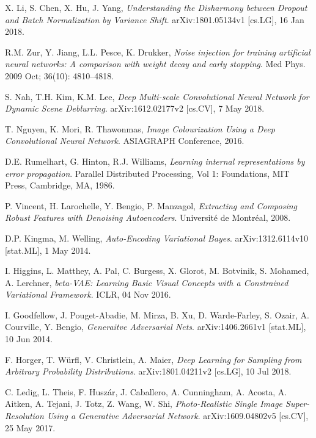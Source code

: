 \documentclass[../main.tex]{subfiles}
\begin{document}
\begin{thebibliography}{999}
X. Li, S. Chen, X. Hu, J. Yang,
\emph{Understanding the Disharmony between Dropout and Batch Normalization by Variance Shift}.
arXiv:1801.05134v1 [cs.LG],
16 Jan 2018.

  R.M. Zur, Y. Jiang, L.L. Pesce, K. Drukker,
  \emph{Noise injection for training artificial neural networks: A comparison with weight decay and early stopping}.
  Med Phys.
  2009 Oct;
  36(10): 4810–4818.

  S. Nah, T.H. Kim, K.M. Lee,
  \emph{Deep Multi-scale Convolutional Neural Network for Dynamic Scene Deblurring}.
  arXiv:1612.02177v2 [cs.CV],
  7 May 2018.

  T. Nguyen, K. Mori, R. Thawonmas,
  \emph{Image Colourization Using a Deep Convolutional Neural Network}.
  ASIAGRAPH Conference,
  2016.

  D.E. Rumelhart, G. Hinton, R.J. Williams,
  \emph{Learning internal representations by error propagation}.
  Parallel Distributed Processing,
  Vol 1: Foundations,
  MIT Press,
  Cambridge, MA,
  1986.

  P. Vincent, H. Larochelle, Y. Bengio, P. Manzagol,
  \emph{Extracting and Composing Robust Features with Denoising Autoencoders}.
  Universit\'e de Montr\'eal,
  2008.

  D.P. Kingma, M. Welling,
  \emph{Auto-Encoding Variational Bayes}.
  arXiv:1312.6114v10 [stat.ML],
  1 May 2014.

  I. Higgins, L. Matthey, A. Pal, C. Burgess, X. Glorot, M. Botvinik, S. Mohamed, A. Lerchner,
  \emph{beta-VAE: Learning Basic Visual Concepts with a Constrained Variational Framework}.
  ICLR,
  04 Nov 2016.

  I. Goodfellow, J. Pouget-Abadie, M. Mirza, B. Xu, D. Warde-Farley, S. Ozair, A. Courville, Y. Bengio,
  \emph{Generaitve Adversarial Nets}.
  arXiv:1406.2661v1 [stat.ML],
  10 Jun 2014.

  F. Horger, T. W\"urfl, V. Christlein, A. Maier,
  \emph{Deep Learning for Sampling from Arbitrary Probability Distributions}.
  arXiv:1801.04211v2 [cs.LG],
  10 Jul 2018.

  C. Ledig, L. Theis, F. Husz\'ar, J. Caballero, A. Cunningham, A. Acosta, A. Aitken, A. Tejani, J. Totz, Z. Wang, W. Shi,
  \emph{Photo-Realistic Single Image Super-Resolution Using a Generative Adversarial Network}.
  arXiv:1609.04802v5 [cs.CV],
  25 May 2017.


\end{thebibliography}
\end{document}

